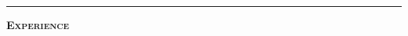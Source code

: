 \documentclass[11 pt]{article}
\begin{document}
\begin{comment}

\begin{center}\textbf{The Bishop's School, La Jolla, CA} \end{center} \vspace{-6 pt}

\textbf{Date of graduation}: May 2008, cum laude \hfill \textbf{GPA}: 4.66/5

\begin{small}

$\bullet$ National AP Scholar, 3$\times$ USAMO qualifier \hfill \textbf{ACT}: 34, \textbf{SAT}: 2230\\





\end{small}

\end{comment}
\hrule

\begin{center}\begin{Large}\textsc{\textbf{Experience}\\}\end{Large}\end{center}
\end{document}
